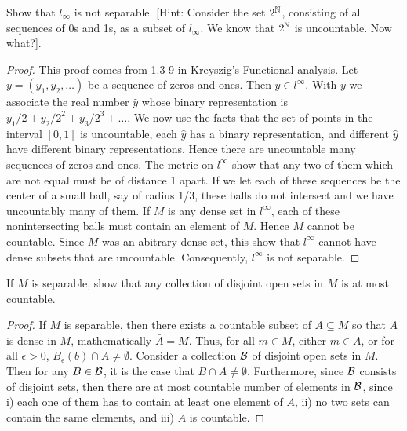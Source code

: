 \begin{exercise}{50}
Show that $l_\infty$ is not separable.
[Hint: Consider the set $2^{\mathbb{N}}$, consisting of all sequences of 0s and 1s, as a subset of $l_\infty$.
We know that $2^{\mathbb{N}}$ is uncountable.
Now what?].
\end{exercise}
\begin{proof}
This proof comes from 1.3-9 in Kreyszig's Functional analysis.
Let $y=(y_1,y_2,\dots)$ be a sequence of zeros and ones.
Then $y\in l^\infty$.
With $y$ we associate the real number $\hat{y}$ whose binary representation is $y_1/2 + y_2/2^2 + y_3/2^3 +\dots$.
We now use the facts that the set of points in the interval $[0,1]$ is uncountable, each $\hat{y}$ has a binary representation, and different $\hat{y}$ have different binary representations.
Hence there are uncountable many sequences of zeros and ones.
The metric on $l^\infty$ show that any two of them which are not equal must be of distance 1 apart.
If we let each of these sequences be the center of a small ball, say of radius 1/3, these balls do not intersect and we have uncountably many of them.
If $M$ is any dense set in $l^\infty$, each of these nonintersecting balls must contain an element of $M$.
Hence $M$ cannot be countable.
Since $M$ was an abitrary dense set, this show that $l^\infty$ cannot have dense subsets that are uncountable.
Consequently, $l^\infty$ is not separable.
\end{proof} 

\begin{exercise}{52}
If $M$ is separable, show that any collection of disjoint open sets in $M$ is at most countable.
\end{exercise}
\begin{proof}
If $M$ is separable, then there exists a countable subset of $A\subseteq M$ so that $A$ is dense in $M$, mathematically $\bar{A}=M$.
Thus, for all $m\in M$, either $m\in A$, or for all $\epsilon>0$, $B_\epsilon(b)\cap A\neq\emptyset$.
Consider a collection $\mathcal{B}$ of disjoint open sets in $M$.
Then for any $B\in \mathcal{B}$, it is the case that $B\cap A\neq\emptyset$. 
Furthermore, since $\mathcal{B}$ consists of disjoint sets, then there are at most countable number of elements in $\mathcal{B}$, since i) each one of them has to contain at least one element of $A$, ii) no two sets can contain the same elements, and iii) $A$ is countable.
\end{proof} 